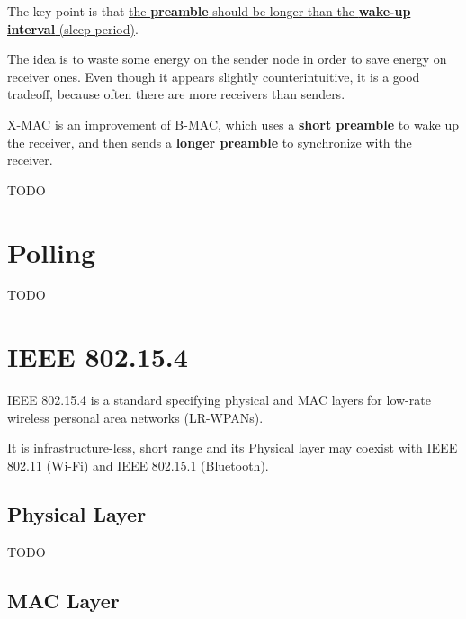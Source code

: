 \begin{center}
   The key point is that \ul{the \textbf{preamble} should be longer than the \textbf{wake-up interval} (sleep period)}.
\end{center}

The idea is to waste some energy on the sender node in order to save energy on receiver ones.
Even though it appears slightly counterintuitive, it is a good tradeoff, because often there are more receivers than senders.


X-MAC is an improvement of B-MAC, which uses a \textbf{short preamble} to wake up the receiver, and then sends a \textbf{longer preamble} to synchronize with the receiver.

TODO

\section{Polling}

TODO

\section{IEEE 802.15.4}

IEEE 802.15.4 is a standard specifying physical and MAC layers for low-rate wireless personal area networks (LR-WPANs).

It is infrastructure-less, short range and its Physical layer may coexist with IEEE 802.11 (Wi-Fi) and IEEE 802.15.1 (Bluetooth). 

\subsection{Physical Layer}

TODO

\subsection{MAC Layer}

